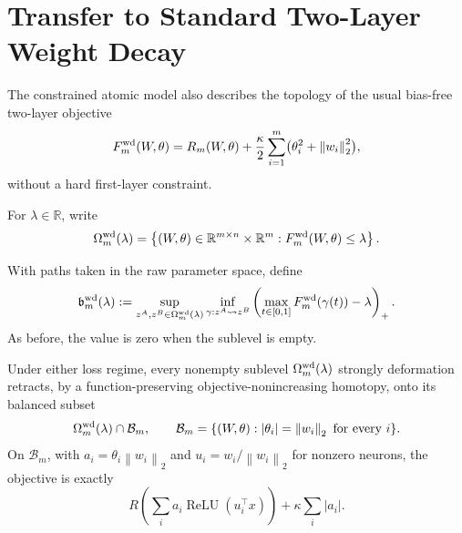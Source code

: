 \documentclass[smallextended,envcountsect]{svjour3}
\newcommand{\relu}{\operatorname{ReLU}}
\newcommand{\R}{\mathbb{R}}
\newcommand{\norm}[1]{\left\lVert #1 \right\rVert}
\newcommand{\abs}[1]{\left\lvert #1 \right\rvert}
\newcommand{\SubBar}{\mathfrak b}
\begin{document}
\section{Transfer to Standard Two-Layer Weight Decay}\label{sec:weight-decay}

The constrained atomic model also describes the topology of the usual
bias-free two-layer objective
\begin{equation}
 F_m^{\rm wd}(W,\theta)=R_m(W,\theta)
 +\frac\kappa2\sum_{i=1}^m
 \bigl(\theta_i^2+\norm{w_i}_2^2\bigr),
 \label{eq:weight-decay-objective}
\end{equation}
without a hard first-layer constraint.

For $\lambda\in\R$, write
\[
 \Omega_m^{\rm wd}(\lambda)
 =\left\{(W,\theta)\in\R^{m\times n}\times\R^m:
 F_m^{\rm wd}(W,\theta)\le\lambda\right\}.
\]

With paths taken in the raw parameter space, define
\begin{equation}
 \SubBar_m^{\rm wd}(\lambda)
 :=\sup_{z^A,z^B\in\Omega_m^{\rm wd}(\lambda)}
 \inf_{\gamma:z^A\leadsto z^B}
 \left(\max_{t\in[0,1]}F_m^{\rm wd}(\gamma(t))-\lambda\right)_+.
 \label{eq:wd-barrier}
\end{equation}
As before, the value is zero when the sublevel is empty.

\begin{theorem}\label{thm:balancing-retraction}
Under either loss regime, every nonempty sublevel
$\Omega_m^{\rm wd}(\lambda)$ strongly deformation retracts, by a
function-preserving objective-nonincreasing homotopy, onto its balanced subset
\[
 \Omega_m^{\rm wd}(\lambda)\cap\mathcal B_m,
 \qquad
 \mathcal B_m=\{(W,\theta):\abs{\theta_i}=\norm{w_i}_2
 \text{ for every }i\}.
\]
On $\mathcal B_m$, with
$a_i=\theta_i\norm{w_i}_2$ and
$u_i=w_i/\norm{w_i}_2$ for nonzero neurons, the objective is exactly
\begin{equation}
 R\!\left(\sum_i a_i\relu(u_i^\top x)\right)
 +\kappa\sum_i\abs{a_i}.
 \label{eq:balanced-atomic-objective}
\end{equation}
\end{theorem}
\end{document}
